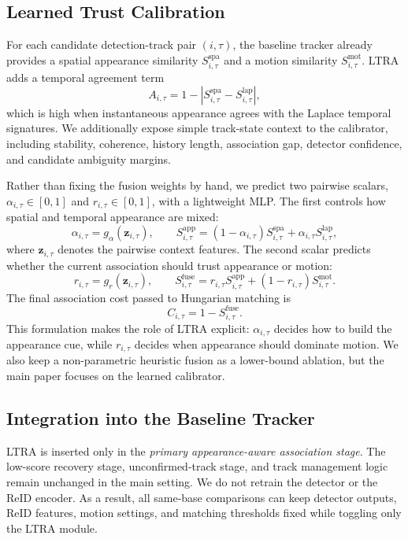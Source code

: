 \subsection{Learned Trust Calibration}
For each candidate detection-track pair $(i,\tau)$, the baseline tracker already provides a spatial appearance similarity $S^{\text{spa}}_{i,\tau}$ and a motion similarity $S^{\text{mot}}_{i,\tau}$. LTRA adds a temporal agreement term
\begin{equation}
A_{i,\tau}=1-\left|S^{\text{spa}}_{i,\tau}-S^{\text{lap}}_{i,\tau}\right|,
\end{equation}
which is high when instantaneous appearance agrees with the Laplace temporal signatures. We additionally expose simple track-state context to the calibrator, including stability, coherence, history length, association gap, detector confidence, and candidate ambiguity margins.

Rather than fixing the fusion weights by hand, we predict two pairwise scalars, $\alpha_{i,\tau}\in[0,1]$ and $r_{i,\tau}\in[0,1]$, with a lightweight MLP. The first controls how spatial and temporal appearance are mixed:
\begin{equation}
\alpha_{i,\tau} = g_\alpha(\mathbf{z}_{i,\tau}), \qquad
S^{\text{app}}_{i,\tau}=(1-\alpha_{i,\tau})S^{\text{spa}}_{i,\tau}+\alpha_{i,\tau}S^{\text{lap}}_{i,\tau},
\end{equation}
where $\mathbf{z}_{i,\tau}$ denotes the pairwise context features. The second scalar predicts whether the current association should trust appearance or motion:
\begin{equation}
r_{i,\tau}=g_r(\mathbf{z}_{i,\tau}), \qquad
S^{\text{fuse}}_{i,\tau}=r_{i,\tau}S^{\text{app}}_{i,\tau}+\left(1-r_{i,\tau}\right)S^{\text{mot}}_{i,\tau}.
\end{equation}
The final association cost passed to Hungarian matching is
\begin{equation}
C_{i,\tau}=1-S^{\text{fuse}}_{i,\tau}.
\end{equation}
This formulation makes the role of LTRA explicit: $\alpha_{i,\tau}$ decides how to build the appearance cue, while $r_{i,\tau}$ decides when appearance should dominate motion. We also keep a non-parametric heuristic fusion as a lower-bound ablation, but the main paper focuses on the learned calibrator.

\subsection{Integration into the Baseline Tracker}
LTRA is inserted only in the \emph{primary appearance-aware association stage}. The low-score recovery stage, unconfirmed-track stage, and track management logic remain unchanged in the main setting. We do not retrain the detector or the ReID encoder. As a result, all same-base comparisons can keep detector outputs, ReID features, motion settings, and matching thresholds fixed while toggling only the LTRA module.

